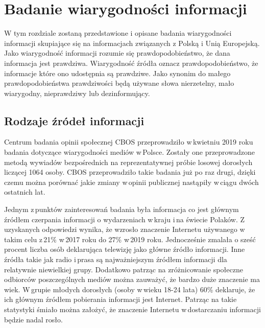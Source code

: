 
\newpage
\section{Badanie wiarygodności informacji}
W tym rozdziale zostaną przedstawione i opisane badania wiarygodności informacji skupiające się na informacjach związanych z Polską i Unią Europejską. Jako wiarygodność informacji rozumie się prawdopodobieństwo, że dana informacja jest prawdziwa. Wiarygodność źródła oznacz prawdopodobieństwo, że informacje które ono udostępnia są prawdziwe. Jako synonim do małego prawdopodobieństwa prawdziwości będą używane słowa nierzetelny, mało wiarygodny, nieprawdziwy lub dezinformujący. 
\subsection{Rodzaje źródeł informacji}
Centrum badania opinii społecznej CBOS przeprowadziło w\,kwietniu 2019 roku badania dotyczące wiarygodności mediów w\,Polsce. Zostały one przeprowadzone metodą wywiadów bezpośrednich na reprezentatywnej próbie losowej dorosłych liczącej 1064 osoby. CBOS przeprowadziło takie badania już po raz drugi, dzięki czemu można porównać jakie zmiany w\,opinii publicznej nastąpiły w\,ciągu dwóch ostatnich lat\cite{CBOSWiarygodnoscMediow2019}.
\par 
Jednym z\,punktów zainteresowań badania była informacja co jest głównym źródłem czerpania informacji o wydarzeniach w\,kraju i\,na świecie Polaków.  Z\,uzyskanych odpowiedzi wynika, że wzrosło znaczenie Internetu używanego w\,takim celu z\,21\% w\,2017 roku do 27\% w\,2019 roku. Jednocześnie zmalała o sześć procent liczba osób deklarująca telewizję jako główne źródło informacji. Inne źródła takie jak radio i\,prasa są najważniejszym źródłem informacji dla relatywnie niewielkiej grupy. Dodatkowo patrząc na zróżnicowanie społeczne odbiorców poszczególnych mediów można zauważyć, że bardzo duże znaczenie ma wiek. W\,grupie młodych dorosłych (osoby w\,wieku 18-24 lata) 60\% deklaruje, że ich głównym źródłem pobierania informacji jest Internet. Patrząc na takie statystyki śmiało można założyć, że znaczenie Internetu w\,dostarczaniu informacji będzie nadal rosło.